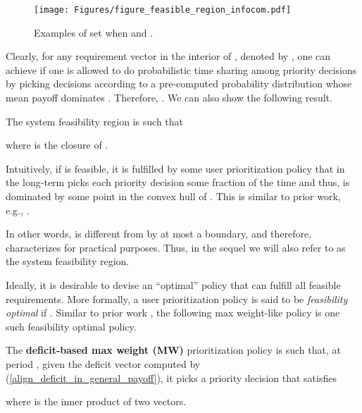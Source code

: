 \documentclass[prodmode,acmtompecs]{acmsmall}
\newcommand{\myComments}[1]{}
\newif\ifinfocom
\newif\ifextended
\newcommand{\infocomStart}{\ifinfocom \myComments{Infocom: }}
\newcommand{\extendedStart}{\ifextended  \myComments{Extended version: }}
\newcommand{\commentEnd}{\myComments{End}}
\begin{document}
\begin{figure}[htp]
  \centering
  \texttt{[image: Figures/figure\_feasible\_region\_infocom.pdf]}
  \caption{Examples of set  when  and . }
  \label{fig_feasible_region}
\end{figure}

Clearly, for any requirement vector  in the interior of , denoted by , one can achieve  if one is allowed to do probabilistic time sharing among priority decisions by picking decisions according to a pre-computed probability distribution whose mean payoff dominates . Therefore, . We can also show the following result. 

\begin{lemma}
\label{lemma_R_in_close_C}
The system feasibility region  is such that

where  is the closure of . 
\end{lemma}

Intuitively, if  is feasible, it is fulfilled by some user prioritization policy that in the long-term picks each priority decision some fraction of the time and thus,  is dominated by some point in the convex hull of . This is similar to prior work, e.g., \cite{TaE92}. 
\infocomStart
See the extended version of this paper \cite{EXT2} for the proof. 
\commentEnd\fi
\extendedStart
See the appendix for a detailed proof. 
\commentEnd\fi
In other words,  is different from  by at most a boundary, and therefore, characterizes  for practical purposes. Thus, in the sequel we will also refer to  as the system feasibility region. 

Ideally, it is desirable to devise an ``optimal'' policy that can fulfill all feasible requirements. 
More formally, a user prioritization policy  is said to be {\em feasibility optimal} if . 
Similar to prior work \cite{TaE92,TaE93}, the following max weight-like policy is one such feasibility optimal policy. 

\begin{definition}
The {\bf deficit-based max weight (MW)} prioritization policy is such that, at period , given the deficit vector  computed by (\ref{align_deficit_in_general_payoff}), it picks a priority decision  that satisfies

where  is the inner product of two vectors. 
\end{definition}


\begin{theorem}
\label{theorem_MW_feasibility_optimal}
\infocomStart
The feasibility region of the MW policy  is such that 

and therefore, the MW policy is feasibility optimal. 
\commentEnd\fi
\extendedStart
The system feasibility region  and the feasibility region of the MW policy  are related to  as follows, 

and therefore, the MW policy is feasibility optimal. 
\commentEnd\fi
\end{theorem}
\end{document}
